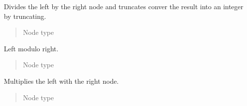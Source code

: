 \documentclass[a4paper,10pt,english]{sphinxmanual}
\begin{document}
\begin{fulllineitems}
\label{extensions:jinja2.nodes.FloorDiv}
Divides the left by the right node and truncates conver the
result into an integer by truncating.
\begin{quote}\begin{description}
\item[{Node type}] \leavevmode
{\hyperref[extensions:jinja2.nodes.BinExpr]{}}

\end{description}\end{quote}

\end{fulllineitems}


\begin{fulllineitems}
\label{extensions:jinja2.nodes.Mod}
Left modulo right.
\begin{quote}\begin{description}
\item[{Node type}] \leavevmode
{\hyperref[extensions:jinja2.nodes.BinExpr]{}}

\end{description}\end{quote}

\end{fulllineitems}


\begin{fulllineitems}
\label{extensions:jinja2.nodes.Mul}
Multiplies the left with the right node.
\begin{quote}\begin{description}
\item[{Node type}] \leavevmode
{\hyperref[extensions:jinja2.nodes.BinExpr]{}}

\end{description}\end{quote}

\end{fulllineitems}

\end{document}
